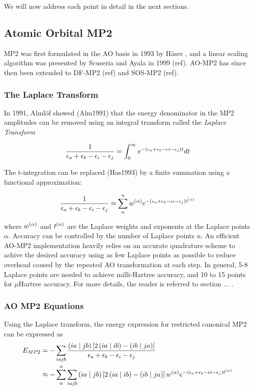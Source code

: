 We will now address each point in detail in the next sections.

\subsection{Atomic Orbital MP2}

MP2 was first formulated in the AO basis in 1993 by Häser , and a linear scaling algorithm was presented by Scuseria and Ayala in 1999 (ref). AO-MP2 has since then been extended to DF-MP2 (ref) and SOS-MP2 (ref). 

\subsubsection{The Laplace Transform}

In 1991, Almlöf showed (Alm1991) that the energy denominator in the MP2 amplitudes can be removed using an integral transform called the \emph{Laplace Transform}

\begin{equation}
\frac{1}{\epsilon_a + \epsilon_b - \epsilon_i - \epsilon_j} = \int_0^{\infty} e^{-\left(\epsilon_a + \epsilon_b - \epsilon i - \epsilon_j\right)t} dt
\end{equation}

The t-integration can be replaced (Has1993) by a finite summation using a functional approximation:

\begin{equation}
\frac{1}{\epsilon_a + \epsilon_b - \epsilon_i - \epsilon_j} \approx \sum_{\alpha}^{n} w^{(\alpha)} e^{-\left(\epsilon_a + \epsilon_b - \epsilon i - \epsilon_j\right)t^{(\alpha)}}
\end{equation} 

\noindent where $w^{(\alpha)}$ and $t^{(\alpha)}$ are the Laplace weights and exponents at the Laplace points $\alpha$. Accuracy can be controlled by the number of Laplace points $n$. An efficient AO-MP2 implementation heavily relies on an accurate quadrature scheme to achive the desired accuracy using as few Laplace points as possible to reduce overhead caused by the repeated AO transformation at each step. In general, 5-8 Laplace points are needed to achieve milli-Hartree accuracy, and 10 to 15 points for $\mu$Hartree accuracy. For more details, the reader is referred to section ... .

\subsubsection{AO MP2 Equations}

Using the Laplace transform, the energy expression for restricted canonical MP2 can be expressed as
\begin{equation}
\begin{split}
E_{MP2} &= - \sum_{iajb} \frac{\left( ia \mid jb \right) \left[2 \left( ia \mid ib \right) - \left( ib \mid ja \right) \right]}{\epsilon_a + \epsilon_b - \epsilon_i - \epsilon_j} \\
&\approx - \sum_{\alpha}^n \sum_{iajb} \left( ia \mid jb \right) \left[2 \left( ia \mid ib \right) - \left( ib \mid ja \right) \right] w^{(\alpha)} e^{-\left(\epsilon_a + \epsilon_b - \epsilon i - \epsilon_j\right)t^{(\alpha)}}
\end{split}
\end{equation}

